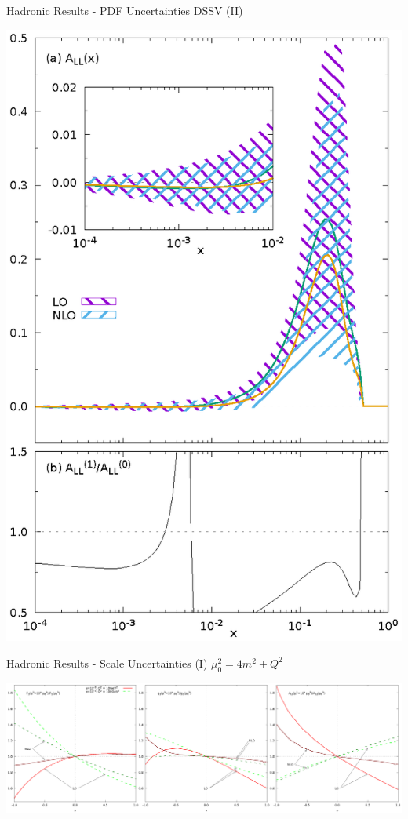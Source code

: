 \begin{frame}{Hadronic Results - PDF Uncertainties DSSV (II)}
\begin{center}
\includegraphics[height=.97\textheight]{img/ALL-pdf}
\end{center}
\end{frame}

\begin{frame}{Hadronic Results - Scale Uncertainties (I)}
$\mu_0^2=4m^2+Q^2$
\begin{center}
\includegraphics[width=\textwidth]{img/F1g1A-mu2}
\end{center}
\end{frame}

